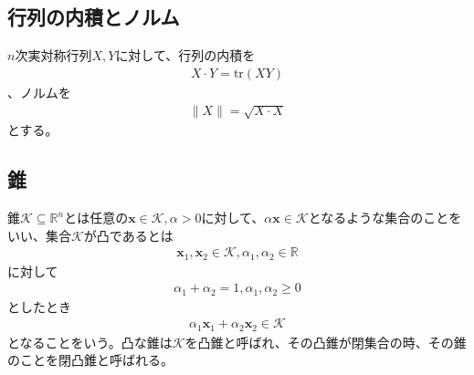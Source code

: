 \subsection{行列の内積とノルム}
$n$次実対称行列$X, Y$に対して、行列の内積を
\begin{align*}
  X \cdot Y = \mathrm{tr}(X Y)
\end{align*}
、ノルムを
\begin{align*}
  \|X\| = \sqrt{X \cdot X}
\end{align*}
とする。

\subsection{錐}
錐$\mathcal{K} \subseteq \mathbb{R}^n$とは任意の$\mathbf{x} \in \mathcal{K}, \alpha > 0$に対して、$\alpha \mathbf{x} \in \mathcal{K}$となるような集合のことをいい、集合$\mathcal{K}$が凸であるとは
\begin{align*}
  \mathbf{x}_1, \mathbf{x}_2 \in \mathcal{K}, \alpha_1, \alpha_2 \in \mathbb{R}
\end{align*}
に対して
\begin{align*}
  \alpha_1 + \alpha_2 = 1, \alpha_1, \alpha_2 \geq 0
\end{align*}
としたとき
\begin{align*}
  \alpha_1 \mathbf{x}_1 + \alpha_2 \mathbf{x}_2 \in \mathcal{K}
\end{align*}
となることをいう。凸な錐は$\mathcal{K}$を凸錐と呼ばれ、その凸錐が閉集合の時、その錐のことを閉凸錐と呼ばれる。

